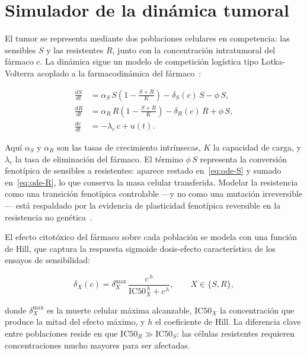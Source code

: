 \section{Simulador de la dinámica tumoral}
\label{sec:simulador}

El tumor se representa mediante dos poblaciones celulares en competencia: las sensibles $S$ y las resistentes $R$, junto con la concentración intratumoral del fármaco $c$. La dinámica sigue un modelo de competición logística tipo Lotka-Volterra acoplado a la farmacodinámica del fármaco~\cite{Strobl2020,Yin2019}:

\begin{align}
  \frac{dS}{dt} &= \alpha_S\, S\left(1 - \frac{S+R}{K}\right) - \delta_S(c)\,S - \phi\,S, \label{eq:ode-S}\\[4pt]
  \frac{dR}{dt} &= \alpha_R\, R\left(1 - \frac{S+R}{K}\right) - \delta_R(c)\,R + \phi\,S, \label{eq:ode-R}\\[4pt]
  \frac{dc}{dt} &= -\lambda_c\, c + u(t). \label{eq:ode-c}
\end{align}

Aquí $\alpha_S$ y $\alpha_R$ son las tasas de crecimiento intrínsecas, $K$ la capacidad de carga, y $\lambda_c$ la tasa de eliminación del fármaco. El término $\phi\,S$ representa la conversión fenotípica de sensibles a resistentes: aparece restado en~\eqref{eq:ode-S} y sumado en~\eqref{eq:ode-R}, lo que conserva la masa celular transferida. Modelar la resistencia como una transición fenotípica controlable ---y no como una mutación irreversible--- está respaldado por la evidencia de plasticidad fenotípica reversible en la resistencia no genética~\cite{Boumahdi2019}.

El efecto citotóxico del fármaco sobre cada población se modela con una función de Hill, que captura la respuesta sigmoide dosis-efecto característica de los ensayos de sensibilidad:

\begin{equation}
  \delta_X(c) = \delta_X^{\max}\, \frac{c^{\,h}}{\mathrm{IC50}_X^{\,h} + c^{\,h}}, \qquad X \in \{S, R\}, \label{eq:hill}
\end{equation}

donde $\delta_X^{\max}$ es la muerte celular máxima alcanzable, $\mathrm{IC50}_X$ la concentración que produce la mitad del efecto máximo, y $h$ el coeficiente de Hill. La diferencia clave entre poblaciones reside en que $\mathrm{IC50}_R \gg \mathrm{IC50}_S$: las células resistentes requieren concentraciones mucho mayores para ser afectadas.

